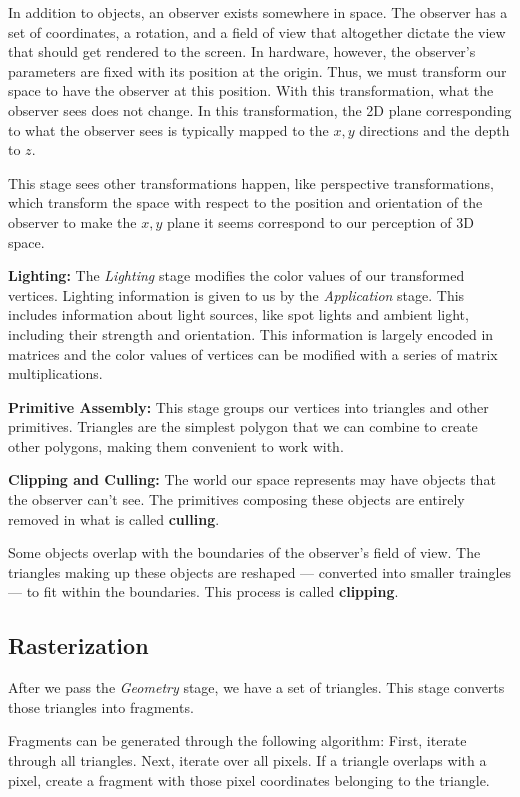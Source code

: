 In addition to objects, an observer exists somewhere in space.
The observer has a set of coordinates, a rotation, and a field of view that altogether dictate the view that should get rendered to the screen.
In hardware, however, the observer's parameters are fixed with its position at the origin.
Thus, we must transform our space to have the observer at this position.
With this transformation, what the observer sees does not change.
In this transformation, the 2D plane corresponding to what the observer
sees is typically mapped to the $x,y$ directions and the depth to $z$.

This stage sees other transformations happen, like perspective transformations,
which transform the space with respect to the position and orientation of the
observer to make the $x,y$ plane it seems correspond to our perception of
3D space.

\textbf{Lighting:}
The \textit{Lighting} stage modifies the color values of our transformed vertices.
Lighting information is given to us by the \textit{Application} stage.
This includes information about light sources, like spot lights and ambient
light, including their strength and orientation.
This information is largely encoded in matrices and the color values of
vertices can be modified with a series of matrix multiplications.

\textbf{Primitive Assembly:}
This stage groups our vertices into triangles and other primitives.
Triangles are the simplest polygon that we can combine to create other polygons,
making them convenient to work with.

\textbf{Clipping and Culling:}
The world our space represents may have objects that the observer can't see.
The primitives composing these objects are entirely removed in what is called \textbf{culling}.

Some objects overlap with the boundaries of the observer's field of view. The
triangles making up these objects are reshaped --- converted into smaller traingles ---
to fit within the boundaries.
This process is called \textbf{clipping}.

\subsection{Rasterization}

After we pass the \textit{Geometry} stage, we have a set of triangles.
This stage converts those triangles into fragments.

Fragments can be generated through the following algorithm:
First, iterate through all triangles. Next, iterate over all pixels.
If a triangle overlaps with a pixel, create a fragment with those pixel
coordinates belonging to the triangle.

